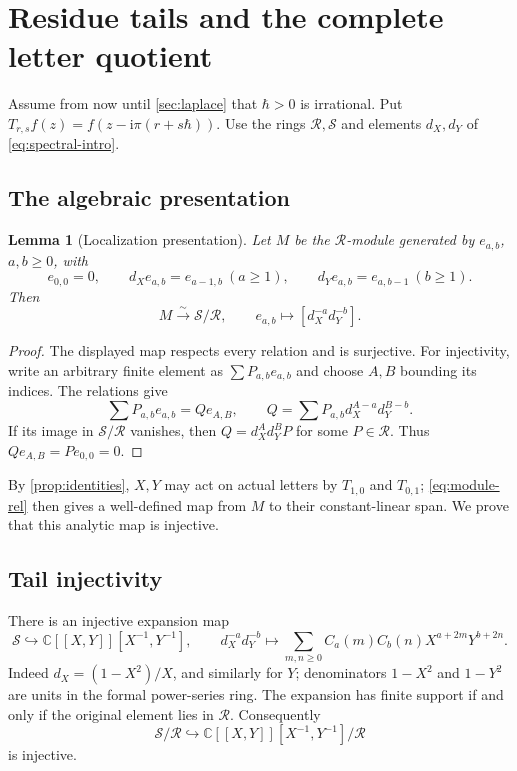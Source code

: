 \documentclass[11pt]{article}
\numberwithin{equation}{section}
\newtheorem{lemma}[lemma]{Lemma}
\theoremstyle{definition}
\theoremstyle{remark}
\newcommand{\C}{\mathbb C}
\newcommand{\ii}{\mathrm i}
\newcommand{\calR}{\mathcal R}
\newcommand{\calS}{\mathcal S}
\newcommand{\qh}{\hbar}
\begin{document}
\section{Residue tails and the complete letter quotient}\label{sec:residues}

Assume from now until \cref{sec:laplace} that $\qh>0$ is irrational. Put
$T_{r,s}f(z)=f(z-\ii\pi(r+s\qh))$. Use the rings
$\calR,\calS$ and elements $d_X,d_Y$ of \eqref{eq:spectral-intro}.

\subsection{The algebraic presentation}

\begin{lemma}[Localization presentation]\label{lem:presentation}
Let $M$ be the $\calR$-module generated by $e_{a,b}$, $a,b\geq0$, with
\begin{equation}\label{eq:module-rel}
 e_{0,0}=0,\qquad d_Xe_{a,b}=e_{a-1,b}\ (a\geq1),\qquad
 d_Ye_{a,b}=e_{a,b-1}\ (b\geq1).
\end{equation}
Then
\begin{equation}\label{eq:module-iso}
 M\xrightarrow{\sim}\calS/\calR,\qquad
 e_{a,b}\longmapsto[d_X^{-a}d_Y^{-b}].
\end{equation}
\end{lemma}
\begin{proof}
The displayed map respects every relation and is surjective. For injectivity,
write an arbitrary finite element as $\sum P_{a,b}e_{a,b}$ and choose $A,B$
bounding its indices. The relations give
\[
 \sum P_{a,b}e_{a,b}=Qe_{A,B},\qquad
 Q=\sum P_{a,b}d_X^{A-a}d_Y^{B-b}.
\]
If its image in $\calS/\calR$ vanishes, then
$Q=d_X^Ad_Y^B P$ for some $P\in\calR$. Thus
$Qe_{A,B}=Pe_{0,0}=0$.
\end{proof}

By \cref{prop:identities}, $X,Y$ may act on actual letters by $T_{1,0}$ and
$T_{0,1}$; \eqref{eq:module-rel} then gives a well-defined map from $M$
to their constant-linear span. We prove that this analytic map is injective.

\subsection{Tail injectivity}

There is an injective expansion map
\begin{equation}\label{eq:expansionmap}
 \calS\hookrightarrow\C[[X,Y]][X^{-1},Y^{-1}],\qquad
 d_X^{-a}d_Y^{-b}\longmapsto
 \sum_{m,n\geq0}C_a(m)C_b(n)X^{a+2m}Y^{b+2n}.
\end{equation}
Indeed $d_X=(1-X^2)/X$, and similarly for $Y$; denominators $1-X^2$ and
$1-Y^2$ are units in the formal power-series ring. The expansion has finite
support if and only if the original element lies in $\calR$. Consequently
\begin{equation}\label{eq:tail-inj}
 \calS/\calR\hookrightarrow
 \C[[X,Y]][X^{-1},Y^{-1}]/\calR
\end{equation}
is injective.
\end{document}
